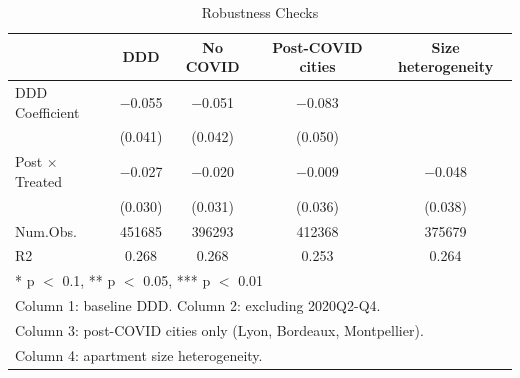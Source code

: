 \begin{table}
\centering
\caption{Robustness Checks}
\centering
\begin{tabular}[t]{lcccc}
\toprule
  & DDD & No COVID & Post-COVID cities & Size heterogeneity\\
\midrule
DDD Coefficient & \num{-0.055} & \num{-0.051} & \num{-0.083} & \\
 & (\num{0.041}) & (\num{0.042}) & (\num{0.050}) & \\
Post $\times$ Treated & \num{-0.027} & \num{-0.020} & \num{-0.009} & \num{-0.048}\\
 & (\num{0.030}) & (\num{0.031}) & (\num{0.036}) & (\num{0.038})\\
\midrule
Num.Obs. & \num{451685} & \num{396293} & \num{412368} & \num{375679}\\
R2 & \num{0.268} & \num{0.268} & \num{0.253} & \num{0.264}\\
\bottomrule
\multicolumn{5}{l}{\rule{0pt}{1em}* p $<$ 0.1, ** p $<$ 0.05, *** p $<$ 0.01}\\
\multicolumn{5}{l}{\rule{0pt}{1em}Column 1: baseline DDD. Column 2: excluding 2020Q2-Q4.}\\
\multicolumn{5}{l}{\rule{0pt}{1em}Column 3: post-COVID cities only (Lyon, Bordeaux, Montpellier).}\\
\multicolumn{5}{l}{\rule{0pt}{1em}Column 4: apartment size heterogeneity.}\\
\end{tabular}
\end{table}
